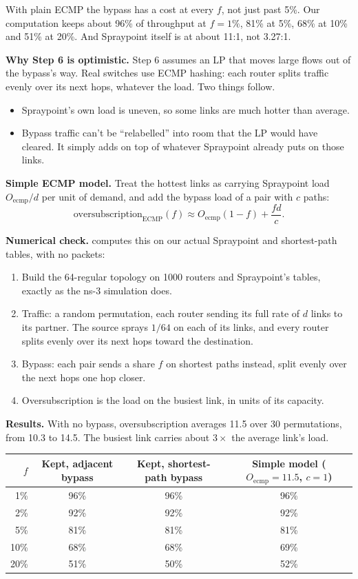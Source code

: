 \documentclass[11pt]{article}
\newcommand{\file}[1]{\path{#1}}
\begin{document}
With plain ECMP the bypass has a cost at every $f$, not just past 5\%. Our computation keeps about 96\% of throughput at $f = 1\%$, 81\% at 5\%, 68\% at 10\% and 51\% at 20\%. And Spraypoint itself is at about 11:1, not 3.27:1.

\textbf{Why Step 6 is optimistic.} Step 6 assumes an LP that moves large flows out of the bypass's way. Real switches use ECMP hashing: each router splits traffic evenly over its next hops, whatever the load. Two things follow.
\begin{itemize}
  \item Spraypoint's own load is uneven, so some links are much hotter than average.
  \item Bypass traffic can't be ``relabelled'' into room that the LP would have cleared. It simply adds on top of whatever Spraypoint already puts on those links.
\end{itemize}

\textbf{Simple ECMP model.} Treat the hottest links as carrying Spraypoint load $O_{\text{ecmp}}/d$ per unit of demand, and add the bypass load of a pair with $c$ paths:
\[
\text{oversubscription}_{\text{ECMP}}(f) \approx O_{\text{ecmp}} (1 - f) + \frac{f d}{c}.
\]

\textbf{Numerical check.} \file{bypass-model} computes this on our actual Spraypoint and shortest-path tables, with no packets:
\begin{enumerate}
  \item Build the 64-regular topology on 1000 routers and Spraypoint's tables, exactly as the ns-3 simulation does.
  \item Traffic: a random permutation, each router sending its full rate of $d$ links to its partner. The source sprays $1/64$ on each of its links, and every router splits evenly over its next hops toward the destination.
  \item Bypass: each pair sends a share $f$ on shortest paths instead, split evenly over the next hops one hop closer.
  \item Oversubscription is the load on the busiest link, in units of its capacity.
\end{enumerate}

\textbf{Results.} With no bypass, oversubscription averages 11.5 over 30 permutations, from 10.3 to 14.5. The busiest link carries about $3\times$ the average link's load.

\begin{center}
\begin{tabular}{@{}rccc@{}}
\toprule
$f$ & Kept, adjacent bypass & Kept, shortest-path bypass & Simple model ($O_{\text{ecmp}} = 11.5$, $c = 1$) \\
\midrule
1\% & 96\% & 96\% & 96\% \\
2\% & 92\% & 92\% & 92\% \\
5\% & 81\% & 81\% & 81\% \\
10\% & 68\% & 68\% & 69\% \\
20\% & 51\% & 50\% & 52\% \\
\bottomrule
\end{tabular}
\end{center}
\end{document}
